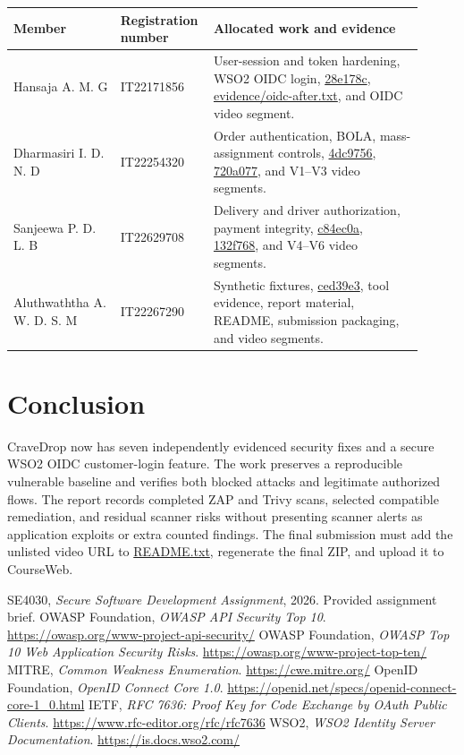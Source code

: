 \documentclass[11pt]{article}
\newcommand{\evidence}[1]{{\small\url{#1}}}
\begin{document}
\begin{longtable}{P{0.25\linewidth}P{0.17\linewidth}P{0.49\linewidth}}
\toprule
{}\textbf{Member} & \textbf{Registration number} & \textbf{Allocated work and evidence} \\
\midrule
\endhead
Hansaja A. M. G & IT22171856 & User-session and token hardening, WSO2 OIDC login, \evidence{28e178c}, \evidence{evidence/oidc-after.txt}, and OIDC video segment. \\
Dharmasiri I. D. N. D & IT22254320 & Order authentication, BOLA, mass-assignment controls, \evidence{4dc9756}, \evidence{720a077}, and V1--V3 video segments. \\
Sanjeewa P. D. L. B & IT22629708 & Delivery and driver authorization, payment integrity, \evidence{c84ec0a}, \evidence{132f768}, and V4--V6 video segments. \\
Aluthwaththa A. W. D. S. M & IT22267290 & Synthetic fixtures, \evidence{ced39e3}, tool evidence, report material, README, submission packaging, and video segments. \\
\bottomrule
\end{longtable}

\section{Conclusion}
CraveDrop now has seven independently evidenced security fixes and a secure WSO2 OIDC customer-login feature. The work preserves a reproducible vulnerable baseline and verifies both blocked attacks and legitimate authorized flows. The report records completed ZAP and Trivy scans, selected compatible remediation, and residual scanner risks without presenting scanner alerts as application exploits or extra counted findings. The final submission must add the unlisted video URL to \evidence{README.txt}, regenerate the final ZIP, and upload it to CourseWeb.

\begin{thebibliography}{9}
 SE4030, \textit{Secure Software Development Assignment}, 2026. Provided assignment brief.
 OWASP Foundation, \textit{OWASP API Security Top 10}. \url{https://owasp.org/www-project-api-security/}
 OWASP Foundation, \textit{OWASP Top 10 Web Application Security Risks}. \url{https://owasp.org/www-project-top-ten/}
 MITRE, \textit{Common Weakness Enumeration}. \url{https://cwe.mitre.org/}
 OpenID Foundation, \textit{OpenID Connect Core 1.0}. \url{https://openid.net/specs/openid-connect-core-1_0.html}
 IETF, \textit{RFC 7636: Proof Key for Code Exchange by OAuth Public Clients}. \url{https://www.rfc-editor.org/rfc/rfc7636}
 WSO2, \textit{WSO2 Identity Server Documentation}. \url{https://is.docs.wso2.com/}
\end{thebibliography}
\end{document}
